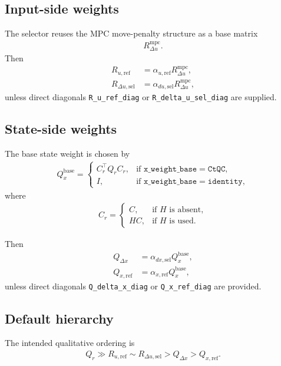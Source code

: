 \documentclass[11pt]{article}
\begin{document}
\subsection{Input-side weights}
The selector reuses the MPC move-penalty structure as a base matrix
\begin{align}
R_{\Delta u}^{\mathrm{mpc}}.
\end{align}
Then
\begin{align}
R_{u,\mathrm{ref}} &= \alpha_{u,\mathrm{ref}} R_{\Delta u}^{\mathrm{mpc}}, \\
R_{\Delta u,\mathrm{sel}} &= \alpha_{du,\mathrm{sel}} R_{\Delta u}^{\mathrm{mpc}},
\end{align}
unless direct diagonals \texttt{R\_u\_ref\_diag} or \texttt{R\_delta\_u\_sel\_diag} are supplied.

\subsection{State-side weights}
The base state weight is chosen by
\begin{align}
Q_x^{\mathrm{base}} =
\begin{cases}
C_r^\top Q_r C_r, & \text{if } \texttt{x\_weight\_base}=\texttt{CtQC},\\
I, & \text{if } \texttt{x\_weight\_base}=\texttt{identity},
\end{cases}
\end{align}
where
\begin{align}
C_r =
\begin{cases}
C, & \text{if } H \text{ is absent},\\
HC, & \text{if } H \text{ is used}.
\end{cases}
\end{align}

Then
\begin{align}
Q_{\Delta x} &= \alpha_{dx,\mathrm{sel}} Q_x^{\mathrm{base}}, \\
Q_{x,\mathrm{ref}} &= \alpha_{x,\mathrm{ref}} Q_x^{\mathrm{base}},
\end{align}
unless direct diagonals \texttt{Q\_delta\_x\_diag} or \texttt{Q\_x\_ref\_diag} are provided.

\subsection{Default hierarchy}
The intended qualitative ordering is
\begin{align}
Q_r \gg R_{u,\mathrm{ref}} \sim R_{\Delta u,\mathrm{sel}} > Q_{\Delta x} > Q_{x,\mathrm{ref}}.
\end{align}
\end{document}
